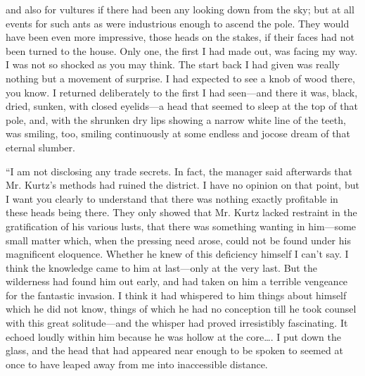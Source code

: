 \documentclass[12pt]{report}
\begin{document}
and also for vultures if there had been any looking down from the sky;
but at all events for such ants as were industrious enough to ascend the
pole. They would have been even more impressive, those heads on the
stakes, if their faces had not been turned to the house. Only one, the
first I had made out, was facing my way. I was not so shocked as you may
think. The start back I had given was really nothing but a movement of
surprise. I had expected to see a knob of wood there, you know. I
returned deliberately to the first I had seen---and there it was, black,
dried, sunken, with closed eyelids---a head that seemed to sleep at the
top of that pole, and, with the shrunken dry lips showing a narrow white
line of the teeth, was smiling, too, smiling continuously at some
endless and jocose dream of that eternal slumber.

``I am not disclosing any trade secrets. In fact, the manager said
afterwards that Mr. Kurtz's methods had ruined the district. I have no
opinion on that point, but I want you clearly to understand that there
was nothing exactly profitable in these heads being there. They only
showed that Mr. Kurtz lacked restraint in the gratification of his
various lusts, that there was something wanting in him---some small
matter which, when the pressing need arose, could not be found under his
magnificent eloquence. Whether he knew of this deficiency himself I
can't say. I think the knowledge came to him at last---only at the very
last. But the wilderness had found him out early, and had taken on him a
terrible vengeance for the fantastic invasion. I think it had whispered
to him things about himself which he did not know, things of which he
had no conception till he took counsel with this great solitude---and
the whisper had proved irresistibly fascinating. It echoed loudly within
him because he was hollow at the core\ldots{}. I put down the glass, and
the head that had appeared near enough to be spoken to seemed at once to
have leaped away from me into inaccessible distance.
\end{document}
